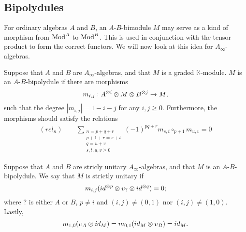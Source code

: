 \documentclass[../thesis.tex]{subfiles}
\begin{document}
        \subsection{Bipolydules}

            For ordinary algebras $A$ and $B$, an $A$-$B$-bimodule $M$ may serve as a kind of morphism from $\tt{Mod}^A$ to $\tt{Mod}^B$. This is used in conjunction with the tensor product to form the correct functors. We will now look at this idea for $A_\infty$-algebras.

            \begin{definition}[$A$-$B$-Bipolydule]
                Suppose that $A$ and $B$ are $A_\infty$-algebras, and that $M$ is a graded $\mathbb{K}$-module. $M$ is an $A$-$B$-bipolydule if there are morphisms
                \begin{align*}
                    m_{i,j} : A^{\otimes i} \otimes M \otimes B^{\otimes j} \rightarrow M\tt{,}
                \end{align*}
                such that the degree $|m_{i,j}| = 1 - i - j$ for any $i,j \geq 0$. Furthermore, the morphisms should satisfy the relations
                \begin{align*}
                    (rel_n)\qquad \sum_{\substack{n = p + q + r \\ p + 1 + r = s + t \\ q = u + v \\ s,t,u,v \geq 0}}(-1)^{pq + r}m_{s,t}\circ_{p+1}m_{u,v} = 0
                \end{align*}
            \end{definition}

            \begin{definition}
                Suppose that $A$ and $B$ are stricly unitary $A_\infty$-algebras, and that $M$ is an $A$-$B$-bipolydule. We say that $M$ is strictly unitary if
                \begin{align*}
                    m_{i,j}(id^{\otimes p} \otimes \upsilon_? \otimes id^{\otimes q}) = 0\tt{;}
                \end{align*}
                where $?$ is either $A$ or $B$, $p \neq i$ and $(i,j) \neq (0,1)$ nor $(i,j) \neq (1,0)$. Lastly,
                \begin{align*}
                    m_{1,0}(\upsilon_A \otimes id_M) = m_{0,1}(id_M \otimes \upsilon_B) = id_M\tt{.}
                \end{align*}
            \end{definition}
\end{document}
